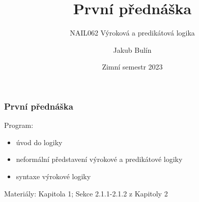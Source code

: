 \documentclass{beamer}
\title{První přednáška}
\subtitle{NAIL062 Výroková a predikátová logika}
\author{Jakub Bulín}
\institute{KTIML MFF UK}
\date{Zimní semestr 2023}
\begin{document}
\frame{\titlepage}

\begin{frame}
\frametitle{První přednáška}

Program: 
    \begin{itemize}
        \item úvod do logiky
        \item neformální představení výrokové a predikátové logiky
        \item syntaxe výrokové logiky
    \end{itemize}

Materiály: Kapitola 1; Sekce 2.1.1-2.1.2 z Kapitoly 2
\end{frame}
\end{document}
